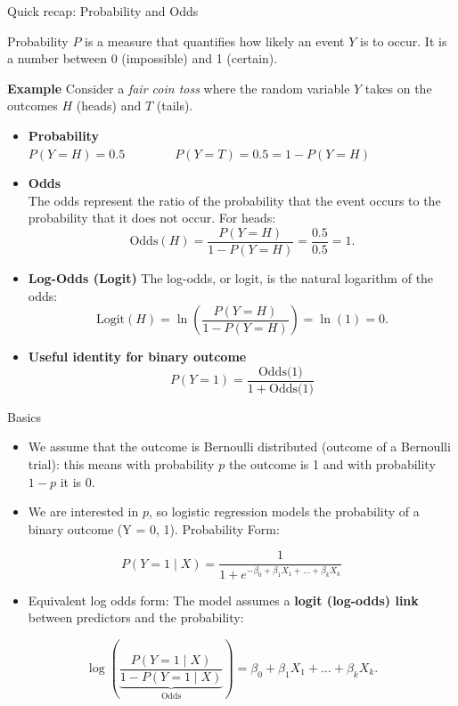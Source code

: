 \documentclass[
  10pt,
  ignorenonframetext,
]{beamer}
\providecommand{\tightlist}{%
  \setlength{\itemsep}{0pt}\setlength{\parskip}{0pt}}\usepackage{longtable,booktabs,array}
\begin{document}
\begin{frame}{Quick recap: Probability and Odds}
\label{quick-recap-probability-and-odds}
\footnotesize

Probability \(P\) is a measure that quantifies how likely an event \(Y\)
is to occur. It is a number between 0 (impossible) and 1 (certain).

\textbf{Example} Consider a \emph{fair coin toss} where the random
variable \(Y\) takes on the outcomes \(H\) (heads) and \(T\) (tails).

\begin{itemize}
\item
  \textbf{Probability}\\
  \(P(Y=H) = 0.5 \qquad\qquad P(Y=T) = 0.5 = 1 - P(Y=H)\)
\item
  \textbf{Odds}\\
  The odds represent the ratio of the probability that the event occurs
  to the probability that it does not occur. For heads: \[
  \text{Odds}(H) = \frac{P(Y=H)}{1 - P(Y=H)} = \frac{0.5}{0.5} = 1.
  \]
\item
  \textbf{Log-Odds (Logit)} The log-odds, or logit, is the natural
  logarithm of the odds: \[
  \text{Logit}(H) = \ln\left(\frac{P(Y=H)}{1 - P(Y=H)}\right) = \ln(1) = 0.
  \]
\item
  \textbf{Useful identity for binary outcome} \[
    P(Y = 1) = \frac{\text{Odds(1)}}{1 + \text{Odds(1)}}
  \]
\end{itemize}
\end{frame}

\begin{frame}{Basics}
\label{basics}
\begin{itemize}
\item
  We assume that the outcome is Bernoulli distributed (outcome of a
  Bernoulli trial): this means with probability \(p\) the outcome is 1
  and with probability \(1-p\) it is 0.
\item
  We are interested in \(p\), so logistic regression models the
  probability of a binary outcome (Y = 0, 1). Probability Form:
\end{itemize}

\[
  P(Y = 1 \mid X) = \frac{1}{1 + e^{-\beta_0 + \beta_1 X_1 + \dots + \beta_k X_k}}
\]

\begin{itemize}
\tightlist
\item
  Equivalent log odds form: The model assumes a \textbf{logit (log-odds)
  link} between predictors and the probability:
\end{itemize}

\[
    \log\left(\underbrace{\frac{P(Y = 1 \mid X)}{1 - P(Y = 1 \mid X)}}_{\text{Odds}}\right) = \beta_0 + \beta_1 X_1 + \dots + \beta_k X_k.
    \]
\end{frame}
\end{document}

